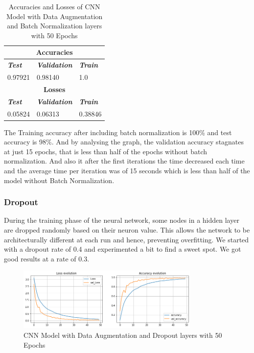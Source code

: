 \documentclass[conference]{IEEEtran}
\begin{document}
\begin{table}[htbp]
\caption{Accuracies and Losses of CNN Model with Data Augmentation and Batch Normalization layers with 50 Epochs}
\begin{center}
\begin{tabular}{|p{2cm}|p{2cm}|p{2cm}|}
\hline
\multicolumn{3}{|c|}{\textbf{Accuracies}} \\
\hline
\textbf{\textit{Test}}& \textbf{\textit{Validation}}& \textbf{\textit{Train}} \\
\hline
0.97921 & 0.98140 & 1.0 \\
\hline
\multicolumn{3}{|c|}{\textbf{Losses}} \\
\hline
\textbf{\textit{Test}}& \textbf{\textit{Validation}}& \textbf{\textit{Train}} \\
\hline
0.05824 & 0.06313 & 0.38846 \\
\hline
\end{tabular}
\end{center}
\end{table}


The Training accuracy after including batch normalization is 100\% and test accuracy is 98\%. And by analysing the graph, the validation accuracy stagnates at just 15 epochs, that is less than half of the epochs without batch normalization. And also it after the first iterations the time decreased each time and the average time per iteration was of 15 seconds which is less than half of the model without Batch Normalization.

\subsubsection{Dropout}

During the training phase of the neural network, some nodes in a hidden layer are dropped randomly based on their neuron value. This allows the network to be architecturally different at each run and hence, preventing overfitting. We started with a dropout rate of 0.4 and experimented a bit to find a sweet spot. We got good results at a rate of 0.3.

\begin{figure}[htbp]
    \centerline{\includegraphics[width=9cm]{img/final_model_drop_50ep.png}}
    \caption{CNN Model with Data Augmentation and Dropout layers with 50 Epochs}
    \label{fig:hist_train_classes}
\end{figure}
\end{document}
